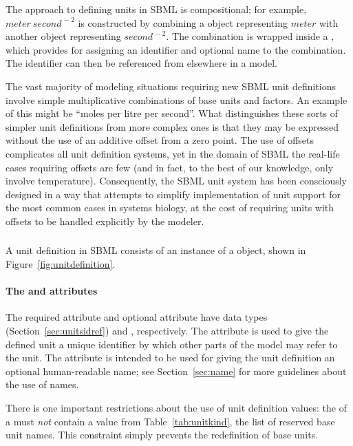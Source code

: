 The approach to defining units in SBML is compositional; for
example, $meter\ second^{\,-2}$ is constructed by combining a
\Unit object representing $meter$ with another \Unit object
representing $second^{\,-2}$.  The combination is wrapped inside a
\UnitDefinition, which provides for assigning an identifier and
optional name to the combination.  The identifier can then be
referenced from elsewhere in a model.

The vast majority of modeling situations requiring new SBML unit
definitions involve simple multiplicative combinations of base
units and factors.  An example of this might be ``moles per litre
per second''.  What distinguishes these sorts of simpler unit
definitions from more complex ones is that they may be expressed
without the use of an additive offset from a zero point.  The use
of offsets complicates all unit definition systems, yet in the
domain of SBML the real-life cases requiring offsets are few (and
in fact, to the best of our knowledge, only involve temperature).
Consequently, the SBML unit system has been consciously designed
in a way that attempts to simplify implementation of unit support
for the most common cases in systems biology, at the cost of
requiring units with offsets to be handled explicitly by the
modeler.


\subsubsection{}
\label{sec:unitdefinition-structure}

A unit definition in SBML consists of an instance of a
\UnitDefinition object, shown in Figure~\ref{fig:unitdefinition}.


\paragraph{The  and  attributes}

The required attribute  and optional attribute
 have data types 
(Section~\ref{sec:unitsidref}) and ,
respectively.  The  attribute is used to give the
defined unit a unique identifier by which other parts of the model
may refer to the unit.  The  attribute is intended to
be used for giving the unit definition an optional human-readable
name; see Section~\ref{sec:name} for more guidelines about the use
of names.

There is one important restrictions about the use of unit
definition  values: the  of a \UnitDefinition
must \emph{not} contain a value from Table~\ref{tab:unitkind}, the
list of reserved base unit names.  This constraint simply prevents
the redefinition of base units.


